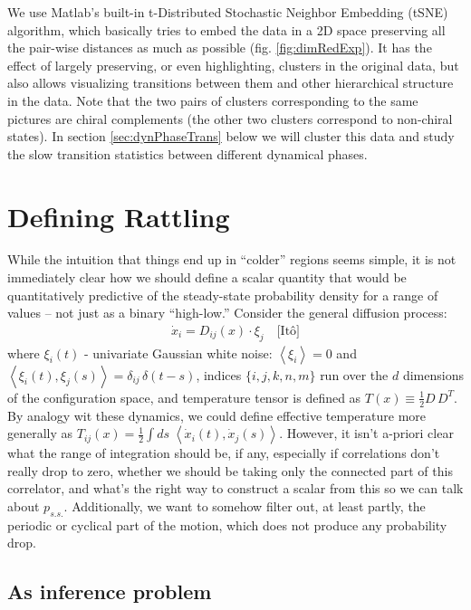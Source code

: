 \documentclass[reprint,prx]{revtex4-1}
\renewcommand{\=}[1]{\stackrel{#1}{=}} %
\renewcommand{\(}{\left (}
\renewcommand{\)}{\right  )}
\renewcommand{\[}{\left [}
\renewcommand{\]}{\right ]}
\newcommand{\<}{\left <}
\renewcommand{\>}{\right >}
\theoremstyle{definition}
\theoremstyle{remark}
\begin{document}
We use Matlab's built-in t-Distributed Stochastic Neighbor Embedding (tSNE) algorithm, which basically tries to embed the data in a 2D space preserving all the pair-wise distances as much as possible (fig. \ref{fig:dimRedExp}). It has the effect of largely preserving, or even highlighting, clusters in the original data, but also allows visualizing transitions between them and other hierarchical structure in the data. Note that the two pairs of clusters corresponding to the same pictures are chiral complements (the other two clusters correspond to non-chiral states). In section \ref{sec:dynPhaseTrans} below we will cluster this data and study the slow transition statistics between different dynamical phases.

\section{Defining Rattling} \label{app:defRatt}

While the intuition that things end up in ``colder'' regions seems simple, it is not immediately clear how we should define a scalar quantity that would be quantitatively predictive of the steady-state probability density for a range of values -- not just as a binary ``high-low.'' Consider the general diffusion process:
\begin{align} \label{eq:MAID}
 \dot{x}_i = D_{ij}(x)\cdot \xi_j \quad \mbox{[It\^o]}
\end{align} 
where $ \xi_i(t) $ - univariate Gaussian white noise: $ \<\xi_i\>=0 $ and $ \<\xi_i(t),\xi_j(s)\>=\delta_{ij}\,\delta(t-s) $, indices $ \{i,j,k,n,m\} $ run over the $ d $ dimensions of the configuration space, and temperature tensor is defined as $ T(x) \equiv \frac{1}{2} D\, D^T $. By analogy wit these dynamics, we could define effective temperature more generally as $ T_{ij}(x) = \frac{1}{2}\int ds \; \<\dot{x}_i(t),\dot{x}_j(s) \> $. However, it isn't a-priori clear what the range of integration should be, if any, especially if correlations don't really drop to zero, whether we should be taking only the connected part of this correlator, and what's the right way to construct a scalar from this so we can talk about $ p_{s.s.} $. Additionally, we want to somehow filter out, at least partly, the periodic or cyclical part of the motion, which does not produce any probability drop. 

\subsection{As inference problem} \label{app:inferT}
\end{document}
